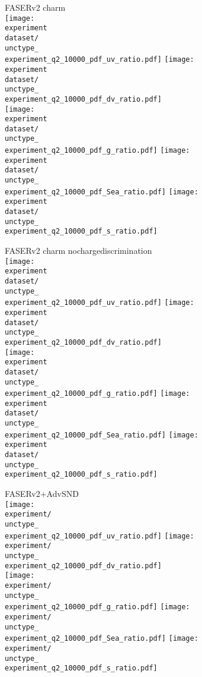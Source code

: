 \documentclass{article}
\newcommand{\figw}{70mm}
\newcommand{\experiment}{FASERv2}
\newcommand{\unctype}{fcorr05}
\begin{document}
\newpage

FASERv2 charm\\
\renewcommand{\dataset}{_charm}
\texttt{[image: \\experiment\\dataset/\\unctype\_\\experiment\_q2\_10000\_pdf\_uv\_ratio.pdf]}
\texttt{[image: \\experiment\\dataset/\\unctype\_\\experiment\_q2\_10000\_pdf\_dv\_ratio.pdf]}\\
\texttt{[image: \\experiment\\dataset/\\unctype\_\\experiment\_q2\_10000\_pdf\_g\_ratio.pdf]}
\texttt{[image: \\experiment\\dataset/\\unctype\_\\experiment\_q2\_10000\_pdf\_Sea\_ratio.pdf]}
\texttt{[image: \\experiment\\dataset/\\unctype\_\\experiment\_q2\_10000\_pdf\_s\_ratio.pdf]}

\newpage

FASERv2 charm nochargediscrimination\\
\renewcommand{\dataset}{_charm_nochargediscrimination}
\texttt{[image: \\experiment\\dataset/\\unctype\_\\experiment\_q2\_10000\_pdf\_uv\_ratio.pdf]}
\texttt{[image: \\experiment\\dataset/\\unctype\_\\experiment\_q2\_10000\_pdf\_dv\_ratio.pdf]}\\
\texttt{[image: \\experiment\\dataset/\\unctype\_\\experiment\_q2\_10000\_pdf\_g\_ratio.pdf]}
\texttt{[image: \\experiment\\dataset/\\unctype\_\\experiment\_q2\_10000\_pdf\_Sea\_ratio.pdf]}
\texttt{[image: \\experiment\\dataset/\\unctype\_\\experiment\_q2\_10000\_pdf\_s\_ratio.pdf]}

\newpage

FASERv2+AdvSND\\
\renewcommand{\experiment}{FPF}
\texttt{[image: \\experiment/\\unctype\_\\experiment\_q2\_10000\_pdf\_uv\_ratio.pdf]}
\texttt{[image: \\experiment/\\unctype\_\\experiment\_q2\_10000\_pdf\_dv\_ratio.pdf]}\\
\texttt{[image: \\experiment/\\unctype\_\\experiment\_q2\_10000\_pdf\_g\_ratio.pdf]}
\texttt{[image: \\experiment/\\unctype\_\\experiment\_q2\_10000\_pdf\_Sea\_ratio.pdf]}
\texttt{[image: \\experiment/\\unctype\_\\experiment\_q2\_10000\_pdf\_s\_ratio.pdf]}
\end{document}
